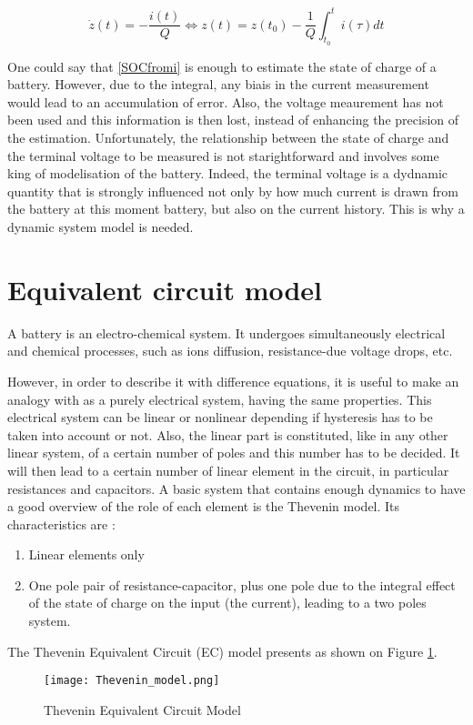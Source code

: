 \documentclass{article}
\begin{document}
\begin{equation}
    \dot{z}(t) = -\frac{i(t)}{Q} \Leftrightarrow z(t) = z(t_0) - \frac{1}{Q} \int_{t_0}^t i(\tau) dt
\label{SOCfromi}
\end{equation}

One could say that \ref{SOCfromi} is enough to estimate the state of charge of a battery. However, due to the integral, any biais in the current measurement would lead to an accumulation of error. Also, the voltage meaurement has not been used and this information is then lost, instead of enhancing the precision of the estimation.
Unfortunately, the relationship between the state of charge and the terminal voltage to be measured is not starightforward and involves some king of modelisation of the battery. Indeed, the terminal voltage is a dydnamic quantity that is strongly influenced not only by how much current is drawn from the battery at this moment battery, but also on the current history. This is why a dynamic system model is needed. 


\section{Equivalent circuit model}

A battery is an electro-chemical system. It undergoes simultaneously electrical and chemical processes, such as ions diffusion, resistance-due voltage drops, etc. 

However, in order to describe it with difference equations, it is useful to make an analogy with as a purely electrical system, having the same properties. This electrical system can be linear or nonlinear depending if hysteresis has to be taken into account or not. Also, the linear part is constituted, like in any other linear system, of a certain number of poles and this number has to be decided. It will then lead to a certain number of linear element in the circuit, in particular resistances and capacitors. 
A basic system that contains enough dynamics to have a good overview of the role of each element is the Thevenin model. Its characteristics are : 

\begin{enumerate}
\item Linear elements only 
\item One pole pair of resistance-capacitor, plus one pole due to the integral effect of the state of charge on the input (the current), leading to a two poles system. 

\end{enumerate}


The Thevenin Equivalent Circuit (EC) model presents as shown on Figure \ref{fig:Thevenin_model}.

\begin{figure}[h]
    \centering
    \texttt{[image: Thevenin\_model.png]}
    \caption{Thevenin Equivalent Circuit Model}
    \label{fig:Thevenin_model}
\end{figure}
\end{document}

